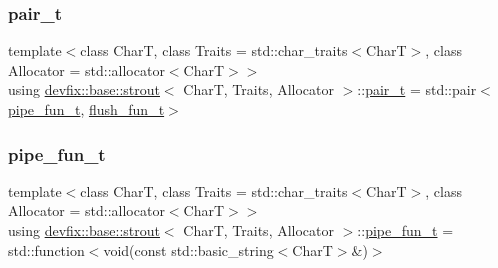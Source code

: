 \mbox{\label{structdevfix_1_1base_1_1strout_a2212cb8a99abec10490e891cc67820bb}} 
\subsubsection{\texorpdfstring{pair\+\_\+t}{pair\_t}}
{\footnotesize\ttfamily template$<$class CharT, class Traits = std\+::char\+\_\+traits$<$\+Char\+T$>$, class Allocator = std\+::allocator$<$\+Char\+T$>$$>$ \\
using \hyperlink{structdevfix_1_1base_1_1strout}{devfix\+::base\+::strout}$<$ CharT, Traits, Allocator $>$\+::\hyperlink{structdevfix_1_1base_1_1strout_a2212cb8a99abec10490e891cc67820bb}{pair\+\_\+t} =  std\+::pair$<$\hyperlink{structdevfix_1_1base_1_1strout_a89bb8340fe2e43bb14c829a1d427d9c0}{pipe\+\_\+fun\+\_\+t}, \hyperlink{structdevfix_1_1base_1_1strout_ad6cf2897069f246b884fa8d526f8bab1}{flush\+\_\+fun\+\_\+t}$>$}

\mbox{\label{structdevfix_1_1base_1_1strout_a89bb8340fe2e43bb14c829a1d427d9c0}} 
\subsubsection{\texorpdfstring{pipe\+\_\+fun\+\_\+t}{pipe\_fun\_t}}
{\footnotesize\ttfamily template$<$class CharT, class Traits = std\+::char\+\_\+traits$<$\+Char\+T$>$, class Allocator = std\+::allocator$<$\+Char\+T$>$$>$ \\
using \hyperlink{structdevfix_1_1base_1_1strout}{devfix\+::base\+::strout}$<$ CharT, Traits, Allocator $>$\+::\hyperlink{structdevfix_1_1base_1_1strout_a89bb8340fe2e43bb14c829a1d427d9c0}{pipe\+\_\+fun\+\_\+t} =  std\+::function$<$void(const std\+::basic\+\_\+string$<$CharT$>$\&)$>$}

\mbox{\label{structdevfix_1_1base_1_1strout_acf852ff3e37e6d10e2cf0332df2b8e2d}} 
